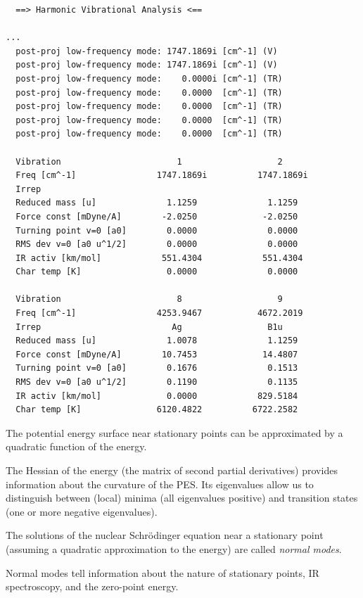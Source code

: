 \documentclass[../Main/chem371-notes.tex]{subfiles}
\begin{document}
\begin{small}
\begin{verbatim}
  ==> Harmonic Vibrational Analysis <==

...
  post-proj low-frequency mode: 1747.1869i [cm^-1] (V)
  post-proj low-frequency mode: 1747.1869i [cm^-1] (V)
  post-proj low-frequency mode:    0.0000i [cm^-1] (TR)
  post-proj low-frequency mode:    0.0000  [cm^-1] (TR)
  post-proj low-frequency mode:    0.0000  [cm^-1] (TR)
  post-proj low-frequency mode:    0.0000  [cm^-1] (TR)
  post-proj low-frequency mode:    0.0000  [cm^-1] (TR)

  Vibration                       1                   2           
  Freq [cm^-1]                1747.1869i          1747.1869i                 
  Irrep                                                                             
  Reduced mass [u]              1.1259              1.1259                      
  Force const [mDyne/A]        -2.0250             -2.0250                     
  Turning point v=0 [a0]        0.0000              0.0000                      
  RMS dev v=0 [a0 u^1/2]        0.0000              0.0000                      
  IR activ [km/mol]            551.4304            551.4304                     
  Char temp [K]                 0.0000              0.0000                  
  
  Vibration                       8                   9           
  Freq [cm^-1]                4253.9467           4672.2019       
  Irrep                          Ag                 B1u          
  Reduced mass [u]              1.0078              1.1259        
  Force const [mDyne/A]        10.7453             14.4807        
  Turning point v=0 [a0]        0.1676              0.1513        
  RMS dev v=0 [a0 u^1/2]        0.1190              0.1135        
  IR activ [km/mol]             0.0000            829.5184       
  Char temp [K]               6120.4822          6722.2582       
\end{verbatim}
\end{small}

\begin{summary}
\item The potential energy surface near stationary points can be approximated by a quadratic function of the energy.
\item The Hessian of the energy (the matrix of second partial derivatives) provides information about the curvature of the PES. Its eigenvalues allow us to distinguish between (local) minima (all eigenvalues positive) and transition states (one or more negative eigenvalues).
\item The solutions of the nuclear Schr\"{o}dinger equation near a stationary point (assuming a quadratic approximation to the energy) are called \emph{normal modes}.
\item Normal modes tell information about the nature of stationary points, IR spectroscopy, and the zero-point energy.
\end{summary}
\end{document}
